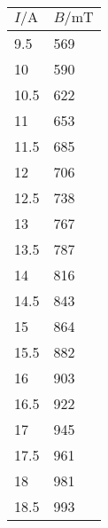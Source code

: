
    \begin{tabular}{l l}
    \toprule
    $ I / \si{\ampere} $ & $ B / \si{\milli\tesla} $ \\
    \midrule
    9.5 & 569 \\
    10 & 590 \\
    10.5 & 622 \\
    11 & 653 \\
    11.5 & 685 \\
    12 & 706 \\
    12.5 & 738 \\
    13 & 767 \\
    13.5 & 787 \\
    14 & 816 \\
    14.5 & 843 \\
    15 & 864 \\
    15.5 & 882 \\
    16 & 903 \\
    16.5 & 922 \\
    17 & 945 \\
    17.5 & 961 \\
    18  & 981 \\
    18.5 & 993 \\



          \bottomrule
        \end{tabular}
